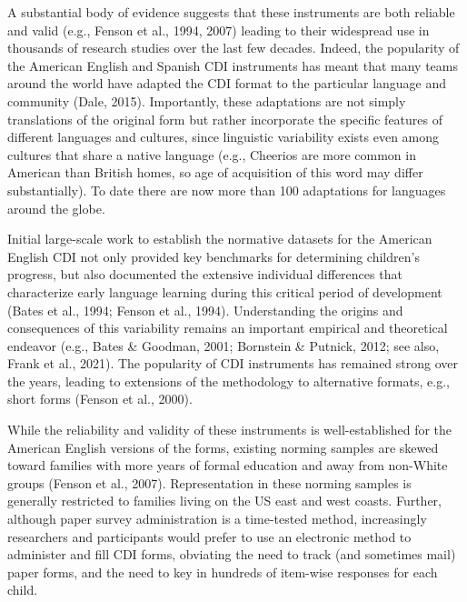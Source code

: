 \documentclass[
  english,
  ,man,floatsintext]{apa6}
\begin{document}
A substantial body of evidence suggests that these instruments are both reliable and valid (e.g., Fenson et al., 1994, 2007) leading to their widespread use in thousands of research studies over the last few decades. Indeed, the popularity of the American English and Spanish CDI instruments has meant that many teams around the world have adapted the CDI format to the particular language and community (Dale, 2015). Importantly, these adaptations are not simply translations of the original form but rather incorporate the specific features of different languages and cultures, since linguistic variability exists even among cultures that share a native language (e.g., Cheerios are more common in American than British homes, so age of acquisition of this word may differ substantially). To date there are now more than 100 adaptations for languages around the globe.

Initial large-scale work to establish the normative datasets for the American English CDI not only provided key benchmarks for determining children's progress, but also documented the extensive individual differences that characterize early language learning during this critical period of development (Bates et al., 1994; Fenson et al., 1994). Understanding the origins and consequences of this variability remains an important empirical and theoretical endeavor (e.g., Bates \& Goodman, 2001; Bornstein \& Putnick, 2012; see also, Frank et al., 2021). The popularity of CDI instruments has remained strong over the years, leading to extensions of the methodology to alternative formats, e.g., short forms (Fenson et al., 2000).

While the reliability and validity of these instruments is well-established for the American English versions of the forms, existing norming samples are skewed toward families with more years of formal education and away from non-White groups (Fenson et al., 2007). Representation in these norming samples is generally restricted to families living on the US east and west coasts. Further, although paper survey administration is a time-tested method, increasingly researchers and participants would prefer to use an electronic method to administer and fill CDI forms, obviating the need to track (and sometimes mail) paper forms, and the need to key in hundreds of item-wise responses for each child.
\end{document}
